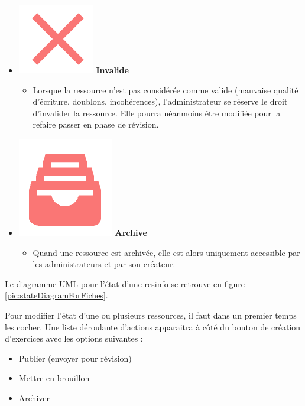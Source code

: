 \begin{itemize}
\begin{itemize}
    \end{itemize} 
    \item \includegraphics[valign=b,height=1.4\fontcharht\font`X]{images/client/not-validated.png} \textbf{Invalide}
    \begin{itemize}
        \item Lorsque la ressource n'est pas considérée comme valide (mauvaise qualité d'écriture, doublons, incohérences), l'administrateur se réserve le droit d'invalider la ressource. Elle pourra néanmoins être modifiée pour la refaire passer en phase de révision.
    \end{itemize}
    \item \includegraphics[valign=b,height=1.4\fontcharht\font`X]{images/client/archive.png} \textbf{Archive}
    \begin{itemize}
        \item Quand une ressource est archivée, elle est alors uniquement accessible par les administrateurs et par son créateur.
    \end{itemize}
\end{itemize}

Le diagramme UML pour l'état d'une \gls{resinfo} se retrouve en figure \ref{pic:stateDiagramForFiches}.


Pour modifier l'état d'une ou plusieurs ressources, il faut dans un premier temps les cocher. Une liste déroulante d'actions apparaitra à côté du bouton de création d'exercices avec les options suivantes :

\begin{itemize}
    \item Publier (envoyer pour révision)
    \item Mettre en brouillon
    \item Archiver
\end{itemize}

